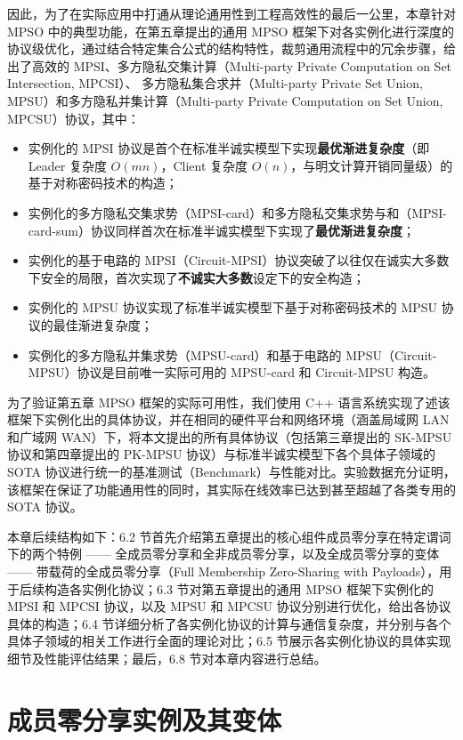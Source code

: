 因此，为了在实际应用中打通从理论通用性到工程高效性的最后一公里，本章针对 MPSO 中的典型功能，在第五章提出的通用 MPSO 框架下对各实例化进行深度的协议级优化，通过结合特定集合公式的结构特性，裁剪通用流程中的冗余步骤，给出了高效的 MPSI、多方隐私交集计算（Multi-party Private Computation on Set Intersection, MPCSI）、 多方隐私集合求并（Multi-party Private Set Union, MPSU）和多方隐私并集计算（Multi-party Private Computation on Set Union, MPCSU）协议，其中：
\begin{itemize}
    \item 实例化的 MPSI 协议是首个在标准半诚实模型下实现\textbf{最优渐进复杂度}（即 Leader 复杂度 $O(mn)$，Client 复杂度 $O(n)$，与明文计算开销同量级）的基于对称密码技术的构造；
    \item 实例化的多方隐私交集求势（MPSI-card）和多方隐私交集求势与和（MPSI-card-sum）协议同样首次在标准半诚实模型下实现了\textbf{最优渐进复杂度}；
    \item 实例化的基于电路的 MPSI（Circuit-MPSI）协议突破了以往仅在诚实大多数下安全的局限，首次实现了\textbf{不诚实大多数}设定下的安全构造；
    \item 实例化的 MPSU 协议实现了标准半诚实模型下基于对称密码技术的 MPSU 协议的最佳渐进复杂度；
    \item 实例化的多方隐私并集求势（MPSU-card）和基于电路的 MPSU（Circuit-MPSU）协议是目前唯一实际可用的 MPSU-card 和 Circuit-MPSU 构造。
\end{itemize}

为了验证第五章 MPSO 框架的实际可用性，我们使用 C++ 语言系统实现了述该框架下实例化出的具体协议，并在相同的硬件平台和网络环境（涵盖局域网 LAN 和广域网 WAN）下，将本文提出的所有具体协议（包括第三章提出的 SK-MPSU 协议和第四章提出的 PK-MPSU 协议）与标准半诚实模型下各个具体子领域的 SOTA 协议进行统一的基准测试（Benchmark）与性能对比。实验数据充分证明，该框架在保证了功能通用性的同时，其实际在线效率已达到甚至超越了各类专用的 SOTA 协议。

本章后续结构如下：6.2 节首先介绍第五章提出的核心组件成员零分享在特定谓词下的两个特例 —— 全成员零分享和全非成员零分享，以及全成员零分享的变体 —— 带载荷的全成员零分享（Full Membership Zero-Sharing with Payloads），用于后续构造各实例化协议；6.3 节对第五章提出的通用 MPSO 框架下实例化的 MPSI 和 MPCSI 协议，以及 MPSU 和 MPCSU 协议分别进行优化，给出各协议具体的构造；6.4 节详细分析了各实例化协议的计算与通信复杂度，并分别与各个具体子领域的相关工作进行全面的理论对比；6.5 节展示各实例化协议的具体实现细节及性能评估结果；最后，6.8 节对本章内容进行总结。

\section{成员零分享实例及其变体}

